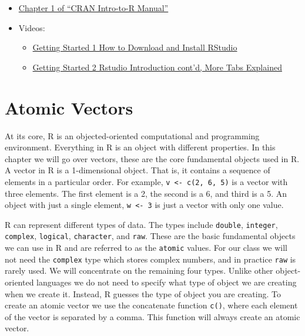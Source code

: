 \documentclass[
]{book}
\providecommand{\tightlist}{%
  \setlength{\itemsep}{0pt}\setlength{\parskip}{0pt}}
\begin{document}
\begin{itemize}
\tightlist
\item
  \href{https://cran.r-project.org/doc/manuals/r-release/R-intro.pdf}{Chapter 1 of ``CRAN Intro-to-R Manual''}
\item
  Videos:

  \begin{itemize}
  \tightlist
  \item
    \href{https://ucr.yuja.com/V/Video?v=2365045\&node=8476457\&a=437885577\&autoplay=1}{Getting Started 1 \textbar{} How to Download and Install RStudio}
  \item
    \href{https://ucr.yuja.com/V/Video?v=2368643\&node=8487538\&a=437248619\&autoplay=1}{Getting Started 2 \textbar{} Rstudio Introduction cont'd, More Tabs Explained}
  \end{itemize}
\end{itemize}

\hypertarget{atomic-vectors}{%
\chapter{Atomic Vectors}\label{atomic-vectors}}

At its core, R is an objected-oriented computational and programming environment. Everything in R is an object with different properties. In this chapter we will go over vectors, these are the core fundamental objects used in R. A vector in R is a 1-dimensional object. That is, it contains a sequence of elements in a particular order. For example, \texttt{v\ \textless{}-\ c(2,\ 6,\ 5)} is a vector with three elements. The first element is a 2, the second is a 6, and third is a 5. An object with just a single element, \texttt{w\ \textless{}-\ 3} is just a vector with only one value.

R can represent different types of data. The types include \texttt{double}, \texttt{integer}, \texttt{complex}, \texttt{logical}, \texttt{character}, and \texttt{raw}. These are the basic fundamental objects we can use in R and are referred to as the \texttt{atomic} values. For our class we will not need the \texttt{complex} type which stores complex numbers, and in practice \texttt{raw} is rarely used. We will concentrate on the remaining four types. Unlike other object-oriented languages we do not need to specify what type of object we are creating when we create it. Instead, R guesses the type of object you are creating. To create an atomic vector we use the concatenate function \texttt{c()}, where each element of the vector is separated by a comma. This function will always create an atomic vector.
\end{document}
